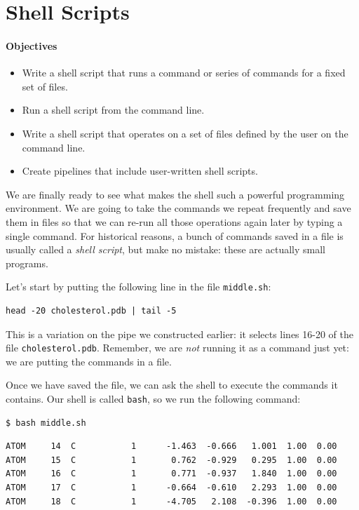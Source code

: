 \documentclass[]{book}
\newcommand{\gdef}[2]{\emph{#2}}
\begin{document}
\section{Shell Scripts}

\mbox{}\paragraph{Objectives}

\begin{itemize}
\item
  Write a shell script that runs a command or series of commands for a
  fixed set of files.
\item
  Run a shell script from the command line.
\item
  Write a shell script that operates on a set of files defined by the
  user on the command line.
\item
  Create pipelines that include user-written shell scripts.
\end{itemize}

We are finally ready to see what makes the shell such a powerful
programming environment. We are going to take the commands we repeat
frequently and save them in files so that we can re-run all those
operations again later by typing a single command. For historical
reasons, a bunch of commands saved in a file is usually called a
\gdef{g:shell-script}{shell script}, but make no mistake: these are
actually small programs.

Let's start by putting the following line in the file
\texttt{middle.sh}:

\begin{verbatim}
head -20 cholesterol.pdb | tail -5
\end{verbatim}

This is a variation on the pipe we constructed earlier: it selects lines
16-20 of the file \texttt{cholesterol.pdb}. Remember, we are \emph{not}
running it as a command just yet: we are putting the commands in a file.

Once we have saved the file, we can ask the shell to execute the
commands it contains. Our shell is called \texttt{bash}, so we run the
following command:

\begin{verbatim}
$ bash middle.sh
\end{verbatim}

\begin{verbatim}
ATOM     14  C           1      -1.463  -0.666   1.001  1.00  0.00
ATOM     15  C           1       0.762  -0.929   0.295  1.00  0.00
ATOM     16  C           1       0.771  -0.937   1.840  1.00  0.00
ATOM     17  C           1      -0.664  -0.610   2.293  1.00  0.00
ATOM     18  C           1      -4.705   2.108  -0.396  1.00  0.00
\end{verbatim}
\end{document}
